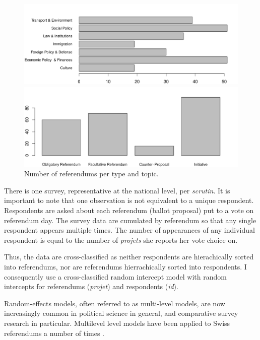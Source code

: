 \documentclass[11pt,a4paper]{article}\usepackage[]{graphicx}\usepackage[]{color}
\makeatletter
\def\maxwidth{ %
  \ifdim\Gin@nat@width>\linewidth
    \linewidth
  \else
    \Gin@nat@width
  \fi
}
\newenvironment{knitrout}{}{} %
\makeatother
\begin{document}
    \begin{figure}
\begin{knitrout}
\color{fgcolor}
\includegraphics[width=\maxwidth]{figure/fig2-1} 

\includegraphics[width=\maxwidth]{figure/fig2-2} 

\end{knitrout}
        \caption{Number of referendums per type and topic.}\label{fig:typetopic}
    \end{figure}
    
    There is one survey, representative at the national level, per \textit{scrutin}. It is important to note that one observation is not equivalent to a unique respondent. Respondents are asked about each referendum (ballot proposal) put to a vote on referendum day. The survey data are cumulated by referendum so that any single respondent appears multiple times. The number of appearances of any individual respondent is equal to the number of \textit{projets} she reports her vote choice on. 
    
    Thus, the data are cross-classified as neither respondents are hierachically sorted into referendums, nor are referendums hierrachically sorted into respondents. I consequently use a cross-classified random intercept model with random intercepts for referendums (\textit{projet}) and respondents (\textit{id}). 
	
	Random-effects models, often referred to as multi-level models, are now increasingly common in political science in general, and comparative survey research in particular. Multilevel level models have been applied to Swiss referendums a number of times \citep[e.g.][]{sciarini_two-level_2009,sciarini_campaign_2011,vatter_who_2014,lanz_vote_2014}. 
	
\end{document}
